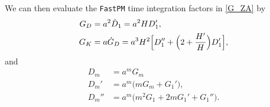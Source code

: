 \documentclass[modern, dvipsnames]{aastex631}
\renewcommand{\d}{d}
\newcommand{\p}{\partial}
\newcommand{\cH}{\mathcal{H}}
\begin{document}
We can then evaluate the \texttt{FastPM} time integration factors in
\eqref{G_ZA} by
%
\begin{align}
G_D &= a^2 \dot D_1 = a^2 H D_1', \nonumber\\
%
G_K &= a \dot G_D = a^3 H^2 \Bigl[
  D_1'' + \Bigl(2 + \frac{H'}H \Bigr) D_1' \Bigr],
\label{G_eval}
\end{align}
%
and
%
\begin{align}
D_m &= a^m G_m \nonumber\\
D_m' &= a^m \bigl( m G_m + G_1' \Bigr), \nonumber\\
D_m'' &= a^m \bigl( m^2 G_1 + 2m G_1' + G_1'' \Bigr).
\end{align}


%
%
\end{document}
